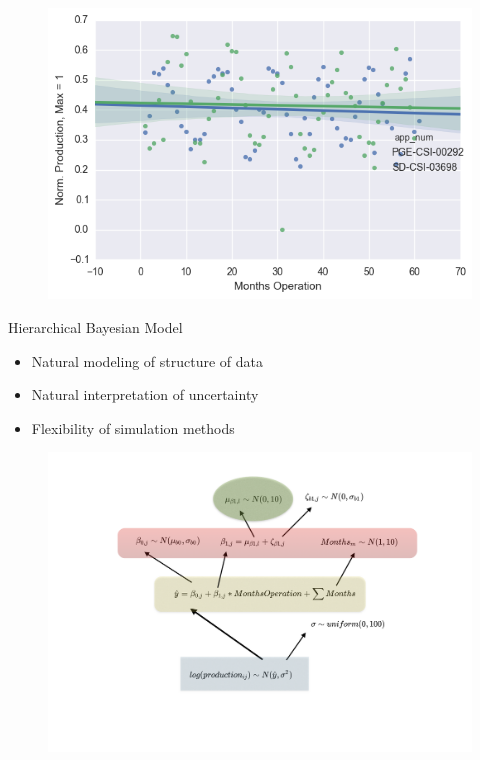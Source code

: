 \documentclass{beamer}
\begin{document}
\begin{frame}
	\begin{figure}
		\includegraphics[width=1\textwidth]{example_prod.png}
		\label{example_prod}
	\end{figure}
\end{frame}

\begin{frame}
	Hierarchical Bayesian Model
	\begin{itemize}
	\item Natural modeling of structure of data
	\item Natural interpretation of uncertainty
	\item Flexibility of simulation methods
	\end{itemize}	
\end{frame}

\begin{frame}
	\begin{figure}
		\includegraphics[width=1\textwidth]{solar_prod_bayes_diag.png}		
	\end{figure}
\end{frame}
\end{document}
